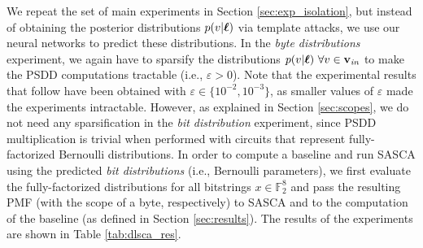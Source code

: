 We repeat the set of main experiments in Section \ref{sec:exp_isolation}, but instead of obtaining the posterior distributions $p(v | \boldsymbol{\ell})$ via template attacks, we use our neural networks to predict these distributions. In the \emph{byte distributions} experiment, we again have to sparsify the distributions $p(v | \boldsymbol{\ell}) \ \forall v \in \mathbf{v}_{\mathit{in}}$ to make the PSDD computations tractable (i.e., $\varepsilon > 0$). Note that the experimental results that follow have been obtained with $\varepsilon \in \{10^{-2}, 10^{-3}\}$, as smaller values of $\varepsilon$ made the experiments intractable.
However, as explained in Section \ref{sec:scopes}, we do not need any sparsification in the \emph{bit distribution} experiment, since PSDD multiplication is trivial when performed with circuits that represent fully-factorized Bernoulli distributions.
In order to compute a baseline and run SASCA using the predicted \emph{bit distributions} (i.e., Bernoulli parameters), we first evaluate the fully-factorized distributions for all bitstrings $x \in \mathbb{F}_2^8$ and pass the resulting PMF (with the scope of a byte, respectively) to SASCA and to the computation of the baseline (as defined in Section \ref{sec:results}).
The results of the experiments are shown in Table \ref{tab:dlsca_res}.
